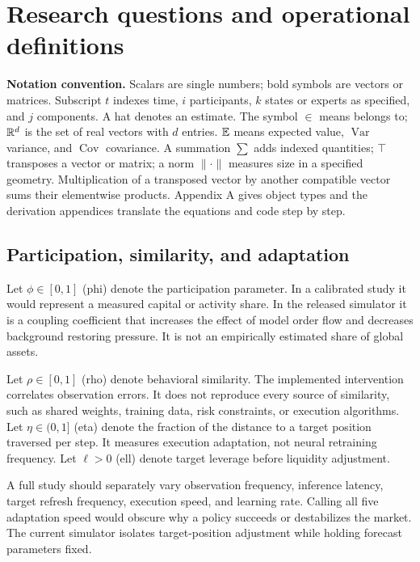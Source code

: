 \section{Research questions and operational definitions}
\textbf{Notation convention.} Scalars are single numbers; bold symbols are vectors or matrices. Subscript $t$ indexes time, $i$ participants, $k$ states or experts as specified, and $j$ components. A hat denotes an estimate. The symbol $\in$ means belongs to; $\mathbb R^d$ is the set of real vectors with $d$ entries. $\mathbb E$ means expected value, $\operatorname{Var}$ variance, and $\operatorname{Cov}$ covariance. A summation $\sum$ adds indexed quantities; $\top$ transposes a vector or matrix; a norm $\|\cdot\|$ measures size in a specified geometry. Multiplication of a transposed vector by another compatible vector sums their elementwise products. Appendix A gives object types and the derivation appendices translate the equations and code step by step.

\subsection{Participation, similarity, and adaptation}
Let $\phi\in[0,1]$ (phi) denote the participation parameter. In a calibrated study it would represent a measured capital or activity share. In the released simulator it is a coupling coefficient that increases the effect of model order flow and decreases background restoring pressure. It is not an empirically estimated share of global assets.

Let $\rho\in[0,1]$ (rho) denote behavioral similarity. The implemented intervention correlates observation errors. It does not reproduce every source of similarity, such as shared weights, training data, risk constraints, or execution algorithms. Let $\eta\in(0,1]$ (eta) denote the fraction of the distance to a target position traversed per step. It measures execution adaptation, not neural retraining frequency. Let $\ell>0$ (ell) denote target leverage before liquidity adjustment.

A full study should separately vary observation frequency, inference latency, target refresh frequency, execution speed, and learning rate. Calling all five adaptation speed would obscure why a policy succeeds or destabilizes the market. The current simulator isolates target-position adjustment while holding forecast parameters fixed.

